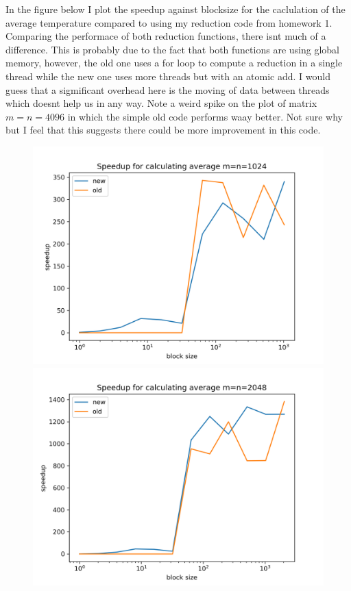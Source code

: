 \documentclass[a4paper]{article}
\begin{document}
	In the figure below I plot the speedup against blocksize for the
	caclulation of the average temperature  compared to using my reduction
	code from homework 1. Comparing the performace of both reduction functions,
	there isnt much of a difference. This is probably due to the fact that both 
	functions are using global memory, however, the old one uses a for loop to compute 
	a reduction in a single thread while the new one uses more threads but with an 
	atomic add. I would guess that a sigmificant overhead here is the moving of data
	between threads which doesnt help us in any way. Note a weird spike on the plot
	of matrix $m=n=4096$ in which the simple old code performs waay better. Not sure
	why but I feel that this suggests there could be more improvement in this code. 

	\begin{figure}[h!]
		\centering
		\begin{minipage}{0.45\linewidth}
			\centering
			\includegraphics[width=\linewidth]{../float/writeup/reduce_plot_m1024.png}
		\end{minipage}%
		\begin{minipage}{0.45\linewidth}
			\centering
			\includegraphics[width=\linewidth]{../float/writeup/reduce_plot_m2048.png}

\end{minipage}
\end{figure}
\end{document}
